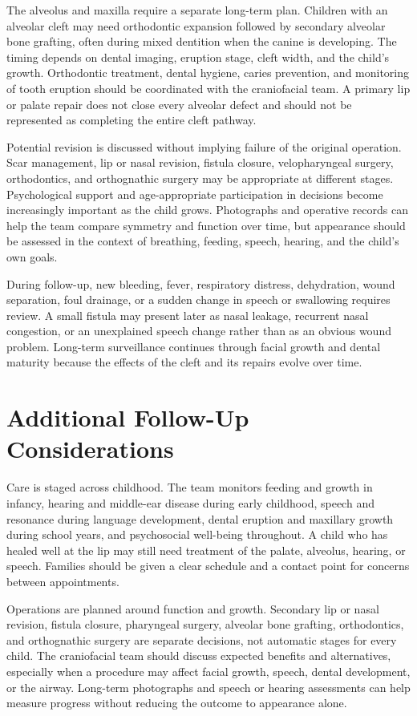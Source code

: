 The alveolus and maxilla require a separate long-term plan. Children with an alveolar cleft may need orthodontic expansion followed by secondary alveolar bone grafting, often during mixed dentition when the canine is developing. The timing depends on dental imaging, eruption stage, cleft width, and the child's growth. Orthodontic treatment, dental hygiene, caries prevention, and monitoring of tooth eruption should be coordinated with the craniofacial team. A primary lip or palate repair does not close every alveolar defect and should not be represented as completing the entire cleft pathway.

Potential revision is discussed without implying failure of the original operation. Scar management, lip or nasal revision, fistula closure, velopharyngeal surgery, orthodontics, and orthognathic surgery may be appropriate at different stages. Psychological support and age-appropriate participation in decisions become increasingly important as the child grows. Photographs and operative records can help the team compare symmetry and function over time, but appearance should be assessed in the context of breathing, feeding, speech, hearing, and the child's own goals.

During follow-up, new bleeding, fever, respiratory distress, dehydration, wound separation, foul drainage, or a sudden change in speech or swallowing requires review. A small fistula may present later as nasal leakage, recurrent nasal congestion, or an unexplained speech change rather than as an obvious wound problem. Long-term surveillance continues through facial growth and dental maturity because the effects of the cleft and its repairs evolve over time.

\section*{Additional Follow-Up Considerations}
Care is staged across childhood. The team monitors feeding and growth in infancy, hearing and middle-ear disease during early childhood, speech and resonance during language development, dental eruption and maxillary growth during school years, and psychosocial well-being throughout. A child who has healed well at the lip may still need treatment of the palate, alveolus, hearing, or speech. Families should be given a clear schedule and a contact point for concerns between appointments.

Operations are planned around function and growth. Secondary lip or nasal revision, fistula closure, pharyngeal surgery, alveolar bone grafting, orthodontics, and orthognathic surgery are separate decisions, not automatic stages for every child. The craniofacial team should discuss expected benefits and alternatives, especially when a procedure may affect facial growth, speech, dental development, or the airway. Long-term photographs and speech or hearing assessments can help measure progress without reducing the outcome to appearance alone.

